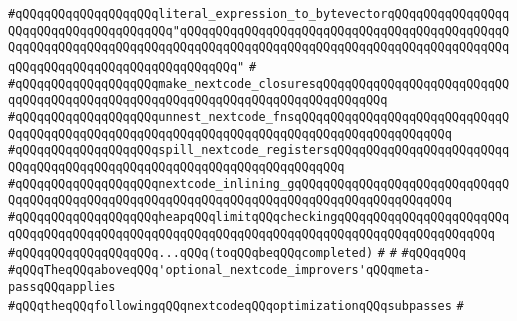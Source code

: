 \verb|#qQQqqQQqqQQqqQQqqQQqliteral_expression_to_bytevectorqQQqqQQqqQQqqQQqqQQqqQQqqQQqqQQqqQQqqQQq"qQQqqQQqqQQqqQQqqQQqqQQqqQQqqQQqqQQqqQQqqQQqqQQqqQQqqQQqqQQqqQQqqQQqqQQqqQQqqQQqqQQqqQQqqQQqqQQqqQQqqQQqqQQqqQQqqQQqqQQqqQQqqQQqqQQqqQQqqQQqqQQqqQQq"|\newline
\verb|#|\newline
\verb|#qQQqqQQqqQQqqQQqqQQqmake_nextcode_closuresqQQqqQQqqQQqqQQqqQQqqQQqqQQqqQQqqQQqqQQqqQQqqQQqqQQqqQQqqQQqqQQqqQQqqQQqqQQqqQQq|\newline
\verb|#qQQqqQQqqQQqqQQqqQQqunnest_nextcode_fnsqQQqqQQqqQQqqQQqqQQqqQQqqQQqqQQqqQQqqQQqqQQqqQQqqQQqqQQqqQQqqQQqqQQqqQQqqQQqqQQqqQQqqQQqqQQq|\newline
\verb|#qQQqqQQqqQQqqQQqqQQqspill_nextcode_registersqQQqqQQqqQQqqQQqqQQqqQQqqQQqqQQqqQQqqQQqqQQqqQQqqQQqqQQqqQQqqQQqqQQqqQQq|\newline
\verb|#qQQqqQQqqQQqqQQqqQQqnextcode_inlining_gqQQqqQQqqQQqqQQqqQQqqQQqqQQqqQQqqQQqqQQqqQQqqQQqqQQqqQQqqQQqqQQqqQQqqQQqqQQqqQQqqQQqqQQqqQQq|\newline
\verb|#qQQqqQQqqQQqqQQqqQQqheapqQQqlimitqQQqcheckingqQQqqQQqqQQqqQQqqQQqqQQqqQQqqQQqqQQqqQQqqQQqqQQqqQQqqQQqqQQqqQQqqQQqqQQqqQQqqQQqqQQqqQQqqQQq|\newline
\verb|#qQQqqQQqqQQqqQQqqQQq...qQQq(toqQQqbeqQQqcompleted)|\newline
\verb|#|\newline
\verb|#|\newline
\verb|#qQQqqQQq|\newline
\verb|#qQQqTheqQQqaboveqQQq'optional_nextcode_improvers'qQQqmeta-passqQQqapplies|\newline
\verb|#qQQqtheqQQqfollowingqQQqnextcodeqQQqoptimizationqQQqsubpasses|\newline
\verb|#|\newline
